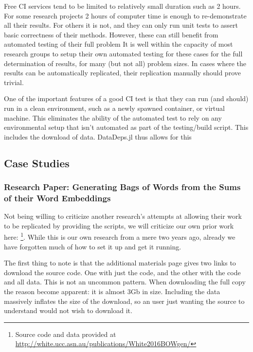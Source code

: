 \documentclass{jors}
\begin{document}
Free CI services tend to be limited to relatively small duration such as 2 hours.
For some research projects 2 hours of computer time is enough to re-demonstrate all their results.
For others it is not, and they can only run unit tests to assert basic correctness of their methods.
However, these can still benefit from automated testing of their full problem
It is well within the capacity of most research groups to setup their own automated testing for these cases for the full determination of results, for many (but not all) problem sizes.
In cases where the results can be automatically replicated, their replication manually should prove trivial.

One of the important features of a good CI test is that they can run (and should) run in a clean environment, such as a newly spawned container, or virtual machine.
This eliminates the ability of the automated test to rely on any environmental setup that isn't automated as part of the testing/build script.
This includes the download of data.
DataDeps.jl thus allows for this 






\subsection{Case Studies}\label{sec:case-studies}
\subsubsection{Research Paper: Generating Bags of Words from the Sums of their Word Embeddings}
Not being willing to criticize another research's attempts at allowing their work to be replicated by providing the scripts, we will criticize our own prior work here: \textcite{White2015BOWgen,White2015BOWgen} \footnote{Source code and data provided at \url{http://white.ucc.asn.au/publications/White2016BOWgen/}}.
While this is our own research from a mere two years ago, already we have forgotten much of how to set it up and get it running.

The first thing to note is that the additional materials page gives two links to download the source code.
One with just the code, and the other with the code and all data.
This is not an uncommon pattern.
When downloading the full copy the reason become apparent: it is almost 3Gb in size.
Including the data massively inflates the size of the download, so an user just wanting the source to understand would not wish to download it.
\end{document}

